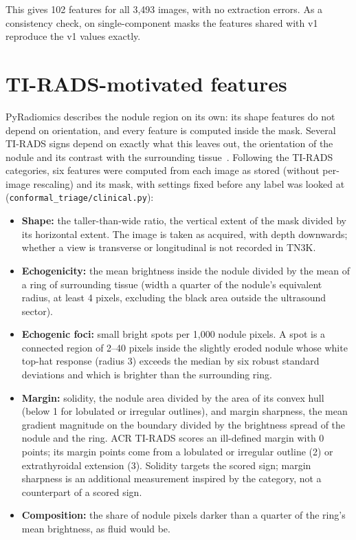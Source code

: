 This gives 102 features for all 3,493 images, with no extraction errors. As a consistency check,
on single-component masks the features shared with v1 reproduce the v1 values exactly.

\section{TI-RADS-motivated features}
\label{sec:methods-clinical}

PyRadiomics describes the nodule region on its own: its shape features do not depend on
orientation, and every feature is computed inside the mask. Several TI-RADS signs depend on
exactly what this leaves out, the orientation of the nodule and its contrast with the surrounding
tissue~\citep{tessler2017}. Following the TI-RADS categories, six features were computed from each
image as stored (without per-image rescaling) and its mask, with settings fixed before any label
was looked at (\texttt{conformal\_triage/clinical.py}):

\begin{itemize}
  \item \textbf{Shape:} the taller-than-wide ratio, the vertical extent of the mask divided by its
        horizontal extent. The image is taken as acquired, with depth downwards; whether a view is
        transverse or longitudinal is not recorded in TN3K.
  \item \textbf{Echogenicity:} the mean brightness inside the nodule divided by the mean of a
        ring of surrounding tissue (width a quarter of the nodule's equivalent radius, at least 4
        pixels, excluding the black area outside the ultrasound sector).
  \item \textbf{Echogenic foci:} small bright spots per 1,000 nodule pixels. A spot is a
        connected region of 2--40 pixels inside the slightly eroded nodule whose white top-hat
        response (radius 3) exceeds the median by six robust standard deviations and which is
        brighter than the surrounding ring.
  \item \textbf{Margin:} solidity, the nodule area divided by the area of its convex hull
        (below 1 for lobulated or irregular outlines), and margin sharpness, the mean gradient
        magnitude on the boundary divided by the brightness spread of the nodule and the ring.
        ACR TI-RADS scores an ill-defined margin with 0 points; its margin points come from a
        lobulated or irregular outline (2) or extrathyroidal extension (3). Solidity targets the
        scored sign; margin sharpness is an additional measurement inspired by the category, not
        a counterpart of a scored sign.
  \item \textbf{Composition:} the share of nodule pixels darker than a quarter of the ring's
        mean brightness, as fluid would be.
\end{itemize}

